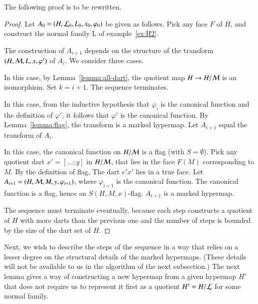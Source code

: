 \begin{note} %
The following proof is to be rewritten.
\end{note}

\begin{proof}
Let $A_0=(H,{\cal L}_0,L_0,x_0,\varphi_0)$ be given as follows.  Pick any face $F$ of $H$, and
construct the normal family {\cal L} of example~\ref{ex:H2}. 

The construction of $A_{i+1}$ depends on the structure of the transform $(H,{\cal M},L,x,\varphi')$ of $A_i$.  We consider three
cases.
\begin{nomerate}
\item 
{}   In this case,  by
Lemma~\ref{lemma:all-dart}, the quotient map $H\to H/{\cal M}$ is an
isomorphism.  Set $k= i+1$. The sequence terminates.
\item 
{}  In this case,  from the inductive hypothesis that $\varphi_i$ is
the canonical function and the definition of $\varphi'$, it follows that $\varphi'$ is the canonical
function.  By Lemma~\ref{lemma:flag}, the transform is
a marked hypermap.  Let  $A_{i+1}$ equal the transform of $A_i$.
\item
{}
In this case, the canonical
function on $H/{\cal M}$ is a flag (with $S=\emptyset$).  Pick any quotient dart $x'=[\ldots;y]$ in $H/{\cal M}$, that
lies in the face $F(M)$ corresponding to $M$.  By the definition of flag,
The dart $e' x'$ lies in a true face.  Let
$A_{i+1} = (H,{\cal M},M,y,\varphi_{i+1})$, where $\varphi_{i+1}$ is the canonical function.
The canonical function is a flag, hence an $S(H,M,x)$-flag.  $A_{i+1}$ is a marked hypermap.
\end{nomerate}

The sequence must terminate eventually, because each step
constructs a quotient of $H$ with more darts than the previous one and
the number of steps is bounded by the size of the dart set of
$H$.
\end{proof}

Next, we wish to describe the steps of the sequence in a way that relies on a lesser degree
on the structural details of the marked hypermaps.  (These details will not be available to us
in the algorithm of the next subsection.)  The next lemma gives a way of constructing a new
hypermap from a given hypermap $H'$ that does not require us to  represent it first as a
quotient $H' = H/{\cal L}$ for some normal family.

